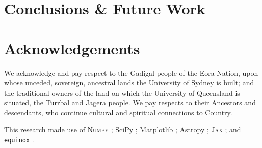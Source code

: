\documentclass[]{spie}
\begin{document}
\section{Conclusions \& Future Work}




\section{Acknowledgements}

We acknowledge and pay respect to the Gadigal people of the Eora Nation, upon whose unceded, sovereign, ancestral lands the University of Sydney is built; and the traditional owners of the land on which the University of Queensland is situated, the Turrbal and Jagera people. We pay respects to their Ancestors and descendants, who continue cultural and spiritual connections to Country. 

This research made use of \textsc{Numpy} \cite{numpy}; SciPy \cite{scipy}; Matplotlib \cite{matplotlib}; Astropy \cite{astropy:2013,astropy:2018}; \textsc{Jax} \cite{jax}; and \texttt{equinox} \cite{kidger2021equinox}.


\end{document}
